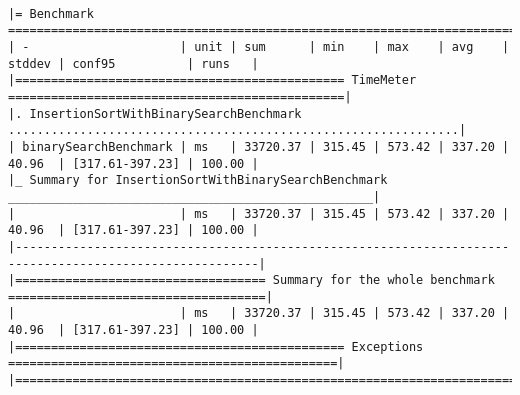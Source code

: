 \documentclass{article}
\begin{document}
\begingroup
\fontsize{8pt}{8pt}\selectfont
\begin{verbatim}

|= Benchmark ============================================================================================|
| -                     | unit | sum      | min    | max    | avg    | stddev | conf95          | runs   |
|============================================== TimeMeter ===============================================|
|. InsertionSortWithBinarySearchBenchmark ...............................................................|
| binarySearchBenchmark | ms   | 33720.37 | 315.45 | 573.42 | 337.20 | 40.96  | [317.61-397.23] | 100.00 |
|_ Summary for InsertionSortWithBinarySearchBenchmark ___________________________________________________|
|                       | ms   | 33720.37 | 315.45 | 573.42 | 337.20 | 40.96  | [317.61-397.23] | 100.00 |
|--------------------------------------------------------------------------------------------------------|
|=================================== Summary for the whole benchmark ====================================|
|                       | ms   | 33720.37 | 315.45 | 573.42 | 337.20 | 40.96  | [317.61-397.23] | 100.00 |
|============================================== Exceptions ==============================================|
|========================================================================================================|

\end{verbatim}
\endgroup
\end{document}
